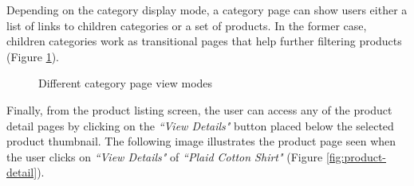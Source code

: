 Depending on the category display mode, a category page can show users either a list of links to children categories or a set of products. In the former case, children categories work as transitional pages that help further filtering products (Figure \ref{fig:category-display-modes}).


\vspace{0.5cm}
\begin{figure}[H]
  \centering
  \qquad
  \caption{Different category page view modes}%
  \label{fig:category-display-modes}%
\end{figure}
\vspace{0.5cm}

Finally, from the product listing screen, the user can access any of the product detail pages by clicking on the \textit{``View Details"} button placed below the selected product thumbnail. The following image illustrates the product page seen when the user clicks on \textit{``View Details"} of \textit{``Plaid Cotton Shirt"} (Figure \ref{fig:product-detail}).


